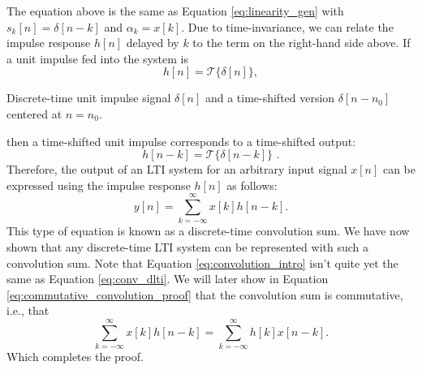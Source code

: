 \fi
\noindent The equation above is the same as Equation \ref{eq:linearity_gen} with $s_k[n] = \delta[n-k]$ and $\alpha_k=x[k]$.  Due to time-invariance,
we can relate the impulse response $h[n]$ delayed by $k$ to the term
on the right-hand side above. If a unit impulse fed into the system is
\begin{equation}
h[n] = \mathcal{T}\{\delta[n]\},
\end{equation}
\begin{marginfigure}
  \begin{center}
  \end{center}
  \caption{Discrete-time unit impulse signal $\delta[n]$ and a time-shifted version $\delta[n-n_0]$ centered at $n=n_0$.}
  \label{fig:dt_unit_impulse}
\end{marginfigure}
then a time-shifted unit impulse corresponds to a time-shifted output:
\begin{equation}
h[n-k] = \mathcal{T}\{\delta[n-k]\}\,\,.
\end{equation}
Therefore, the output of an LTI system for an arbitrary input signal
$x[n]$ can be expressed using the impulse response $h[n]$ as follows:
\begin{equation}
  y[n] = \sum_{k=-\infty}^{\infty} x[k]h[n-k].
  \label{eq:convolution_intro}
\end{equation}
This type of equation is known as a discrete-time convolution sum. We have now shown that any discrete-time LTI system can be represented with such a convolution sum. 
Note that Equation \ref{eq:convolution_intro} isn't quite yet the same as Equation \ref{eq:conv_dlti}. We will later show in Equation \ref{eq:commutative_convolution_proof} that the convolution sum is commutative, i.e., that
\begin{equation}
 \sum_{k=-\infty}^{\infty} x[k]h[n-k] = \sum_{k=-\infty}^{\infty} h[k]x[n-k].
\end{equation}
Which completes the proof.

